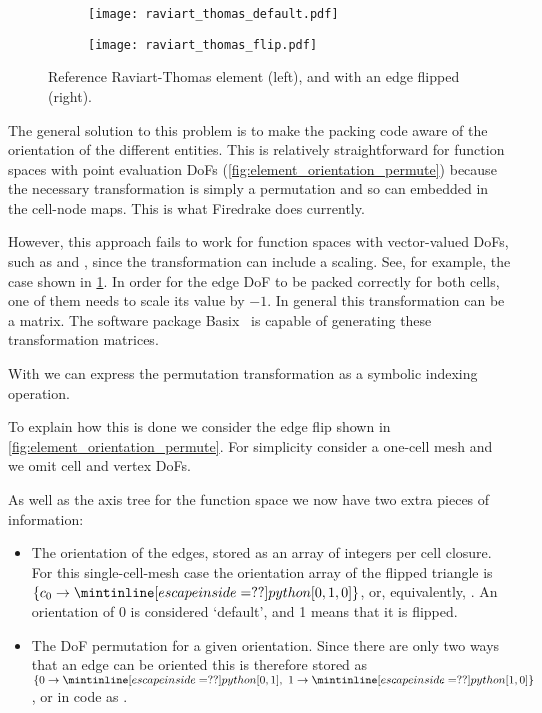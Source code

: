 \documentclass[thesis]{subfiles}
\begin{document}
\begin{figure}
  \centering
  \begin{subfigure}{0.45\textwidth}
    \centering
    \texttt{[image: raviart\_thomas\_default.pdf]}
  \end{subfigure}
  \begin{subfigure}{0.45\textwidth}
    \centering
    \texttt{[image: raviart\_thomas\_flip.pdf]}
  \end{subfigure}
  \caption{Reference Raviart-Thomas element (left), and with an edge flipped (right).}
  \label{fig:element_orientation_flip}
\end{figure}

The general solution to this problem is to make the packing code aware of the orientation of the different entities.
This is relatively straightforward for function spaces with point evaluation DoFs (\cref{fig:element_orientation_permute}) because the necessary transformation is simply a permutation and so can embedded in the cell-node maps.
This is what Firedrake does currently.

However, this approach fails to work for function spaces with vector-valued DoFs, such as \hdiv and \hcurl, since the transformation can include a scaling.
See, for example, the case shown in \cref{fig:element_orientation_flip}.
In order for the edge DoF to be packed correctly for both cells, one of them needs to scale its value by $-1$.
In general this transformation can be a matrix.
The software package Basix~\cite{scroggsBasixRuntimeFinite2022,scroggsConstructionArbitraryOrder2021} is capable of generating these transformation matrices.

With  we can express the permutation transformation as a symbolic indexing operation.

To explain how this is done we consider the edge flip shown in \cref{fig:element_orientation_permute}.
For simplicity consider a one-cell mesh and we omit cell and vertex DoFs.

As well as the axis tree for the function space we now have two extra pieces of information:
\begin{itemize}
  \item
    The orientation of the edges, stored as an array of integers per cell closure.
    For this single-cell-mesh case the orientation array of the flipped triangle is $\{ c_0 \to \pycode{[0, 1, 0]} \}$, or, equivalently, .
    An orientation of 0 is considered `default', and 1 means that it is flipped.

  \item
    The DoF permutation for a given orientation.
    Since there are only two ways that an edge can be oriented this is therefore stored as $\{ 0 \to \pycode{[0, 1]},\ 1 \to \pycode{[1, 0]} \}$, or in code as .
\end{itemize}
\end{document}
